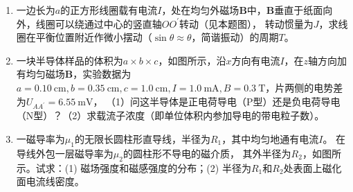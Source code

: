 \documentclass[UTF-8]{ctexart}
\newcommand{\csi}[2]{ \SI{#1}{#2}}
\begin{document}
\begin{enumerate}
    \item 一边长为\(a\)的正方形线圈载有电流\(I\)，处在均匀外磁场\(\bm{B}\)中，\(\bm{B}\)垂直于纸面向外，线圈可以绕通过中心的竖直轴\(OO^\prime\)转动（见本题图），
        转动惯量为\(J\)，求线圈在平衡位置附近作微小摆动（\(\sin\theta\approx\theta\)，简谐振动）的周期\(T\)。

    \item 一块半导体样品的体积为\(a\times b\times c\)，如图所示，沿\(x\)方向有电流\(I\)，在\(z\)轴方向加有均匀磁场\(\bm{B}\)，实验数据为
        \(a=\csi{0.10}{\cm}, b=\csi{0.35}{\cm},c=\csi{1.0}{\cm}, I=\csi{1.0}{\mA}, B=\csi{0.3}{\tesla}\)，片两侧的电势差为\(U_{AA^\prime}=\csi{6.55}{\mV}\)，
        （1）问这半导体是正电荷导电（P型）还是负电荷导电（N型）？（2）求载流子浓度（即单位体积内参加导电的带电粒子数）。
    
    \item 一磁导率为\(\mu_1\)的无限长圆柱形直导线，半径为\(R_1\)，其中均匀地通有电流\(I\)。 在导线外包一层磁导率为\(\mu_2\)的圆柱形不导电的磁介质，
        其外半径为\(R_2\)，如图所示。试求：(1) 磁场强度和磁感强度的分布；(2) 半径为\(R_1\)和\(R_2\)处表面上磁化面电流线密度。
\end{enumerate}
\end{document}
